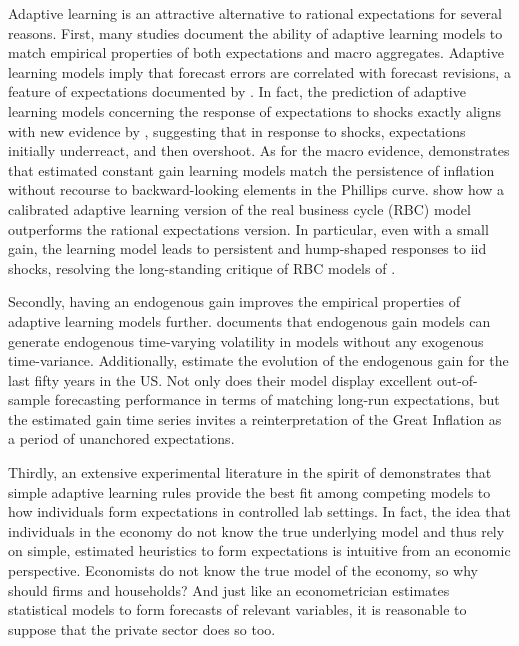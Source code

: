 \documentclass[11pt]{article}
\renewcommand{\[}{\begin{equation}}
\renewcommand{\]}{\end{equation}}
\begin{document}
Adaptive learning is an attractive alternative to rational expectations for several reasons. 
First, many studies document the ability of adaptive learning models to match empirical properties of both expectations and macro aggregates. Adaptive learning models imply that forecast errors are correlated with forecast revisions, a feature of expectations documented by \cite{coibion2015information}. In fact, the prediction of adaptive learning models concerning the response of expectations to shocks exactly aligns with new evidence by \cite{NBERw27308}, suggesting that in response to shocks, expectations initially underreact, and then overshoot. As for the macro evidence, \cite{milani2007expectations} demonstrates that estimated constant gain learning models match the persistence of inflation without recourse to backward-looking elements in the Phillips curve. \cite{eusepi2011expectations} show how a calibrated adaptive learning version of the real business cycle (RBC) model outperforms the rational expectations version. In particular, even with a small gain, the learning model leads to persistent and hump-shaped responses to iid shocks, resolving the long-standing critique of RBC models of \cite{cogley1993impulse}. 

Secondly, having an endogenous gain improves the empirical properties of adaptive learning models further. \cite{milani2014learning} documents that endogenous gain models can generate endogenous time-varying volatility  in models without any exogenous time-variance. Additionally, \cite{carvalho2019anchored} estimate the evolution of the endogenous gain for the last fifty years in the US. Not only does their model display excellent out-of-sample forecasting performance in terms of matching long-run expectations, but the estimated gain time series invites a reinterpretation of the Great Inflation as a period of unanchored expectations. %

Thirdly, an extensive experimental literature in the spirit of \cite{anufriev2012evolutionary} demonstrates that simple adaptive learning rules provide the best fit among competing models to how individuals form expectations in controlled lab settings. In fact, the idea that individuals in the economy do not know the true underlying model and thus rely on simple, estimated heuristics to form expectations is intuitive from an economic perspective. Economists do not know the true model of the economy, so why should firms and households? And just like an econometrician estimates statistical models to form forecasts of relevant variables, it is reasonable to suppose that the private sector does so too.
\end{document}
